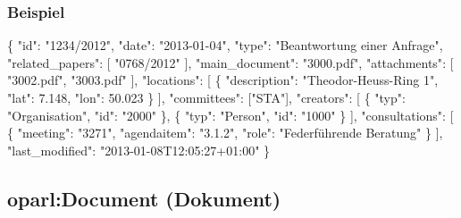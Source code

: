 \documentclass[,a4paper]{article}
\newenvironment{Shaded}{}{}
\newcommand{\DataTypeTok}[1]{\textcolor[rgb]{0.56,0.13,0.00}{{#1}}}
\newcommand{\FloatTok}[1]{\textcolor[rgb]{0.25,0.63,0.44}{{#1}}}
\newcommand{\StringTok}[1]{\textcolor[rgb]{0.25,0.44,0.63}{{#1}}}
\newcommand{\NormalTok}[1]{{#1}}
\begin{document}
\subsubsection{Beispiel}

\begin{Shaded}
\begin{Highlighting}[]
\NormalTok{\{}
    \DataTypeTok{"id"}\NormalTok{: }\StringTok{"1234/2012"}\NormalTok{,}
    \DataTypeTok{"date"}\NormalTok{: }\StringTok{"2013-01-04"}\NormalTok{,}
    \DataTypeTok{"type"}\NormalTok{: }\StringTok{"Beantwortung einer Anfrage"}\NormalTok{,}
    \DataTypeTok{"related_papers"}\NormalTok{: [}
        \StringTok{"0768/2012"}
    \NormalTok{],}
    \DataTypeTok{"main_document"}\NormalTok{: }\StringTok{"3000.pdf"}\NormalTok{,}
    \DataTypeTok{"attachments"}\NormalTok{: [}
        \StringTok{"3002.pdf"}\NormalTok{,}
        \StringTok{"3003.pdf"}
    \NormalTok{],}
    \DataTypeTok{"locations"}\NormalTok{: [}
        \NormalTok{\{}
            \DataTypeTok{"description"}\NormalTok{: }\StringTok{"Theodor-Heuss-Ring 1"}\NormalTok{,}
            \DataTypeTok{"lat"}\NormalTok{: }\FloatTok{7.148}\NormalTok{,}
            \DataTypeTok{"lon"}\NormalTok{: }\FloatTok{50.023}
        \NormalTok{\}}
    \NormalTok{],}
    \DataTypeTok{"committees"}\NormalTok{: [}\StringTok{"STA"}\NormalTok{],}
    \DataTypeTok{"creators"}\NormalTok{: [}
        \NormalTok{\{}
            \DataTypeTok{"typ"}\NormalTok{: }\StringTok{"Organisation"}\NormalTok{,}
            \DataTypeTok{"id"}\NormalTok{: }\StringTok{"2000"}
        \NormalTok{\},}
        \NormalTok{\{}
            \DataTypeTok{"typ"}\NormalTok{: }\StringTok{"Person"}\NormalTok{,}
            \DataTypeTok{"id"}\NormalTok{: }\StringTok{"1000"}
        \NormalTok{\}}
    \NormalTok{],}
    \DataTypeTok{"consultations"}\NormalTok{: [}
        \NormalTok{\{}
            \DataTypeTok{"meeting"}\NormalTok{: }\StringTok{"3271"}\NormalTok{,}
            \DataTypeTok{"agendaitem"}\NormalTok{: }\StringTok{"3.1.2"}\NormalTok{,}
            \DataTypeTok{"role"}\NormalTok{: }\StringTok{"Federführende Beratung"}
        \NormalTok{\}}
    \NormalTok{],}
    \DataTypeTok{"last_modified"}\NormalTok{: }\StringTok{"2013-01-08T12:05:27+01:00"}
\NormalTok{\}}
\end{Highlighting}
\end{Shaded}

\subsection{oparl:Document (Dokument)}
\end{document}
